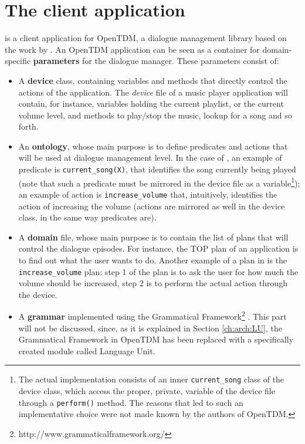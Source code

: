 \section{The client application} \label{ch:arch:client}
\pname is a client application for OpenTDM, a dialogue management library based on the work by \cite{Larsson02issue-baseddialogue}. An OpenTDM application can be seen as a container for domain-specific \textbf{parameters} for the dialogue manager. These parameters consist of:
\begin{itemize}
\item A \textbf{device} class, containing variables and methods that directly control the actions of the application. The \textit{device} file of a music player application will contain, for instance, variables holding the current playlist, or the current volume level, and methods to play/stop the music, lookup for a song and so forth.
\item An \textbf{ontology}, whose main purpose is to define predicates and actions that will be used at dialogue management level. In the case of \pname, an example of predicate is \texttt{current\_song(X)}, that identifies the song currently being played (note that such a predicate must be mirrored in the device file as a variable\footnote{The actual implementation consists of an inner \texttt{current\_song} class of the device class, which access the proper, private, variable of the device file through a \texttt{perform()} method. The reasons that led to such an implementative choice were not made known by the authors of OpenTDM.}); an example of action is \texttt{increase\_volume} that, intuitively, identifies the action of increasing the volume (actions are mirrored as well in the device class, in the same way predicates are).
\item A \textbf{domain} file, whose main purpose is to contain the list of plans that will control the dialogue episodes. For instance, the TOP plan of an application is to find out what the user wants to do. Another example of a plan in \pname is the \texttt{increase\_volume} plan: step 1 of the plan is to ask the user for how much the volume should be increased, step 2 is to perform the actual action through the device.
\item A \textbf{grammar} implemented using the Grammatical Framework\footnote{http://www.grammaticalframework.org/} \citep{citeulike:346448}. This part will not be discussed, since, as it is explained in Section \ref{ch:arch:LU}, the Grammatical Framework in OpenTDM has been replaced with a specifically created module called Language Unit.
\end{itemize}


